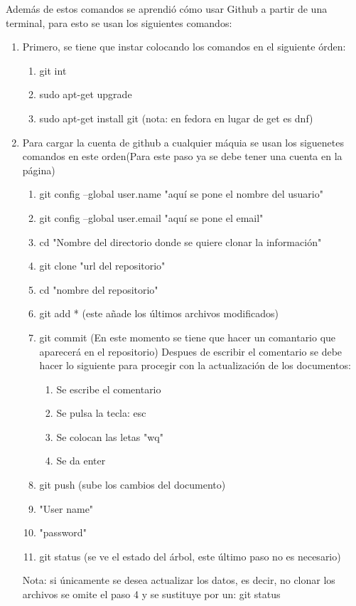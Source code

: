 \documentclass[letterpaper, 12pt, oneside]{article}
\begin{document}
	Además de estos comandos se aprendió cómo usar Github a partir de una terminal, para esto se usan los siguientes comandos:
	\begin{enumerate}
		\item 
		Primero, se tiene que instar colocando los comandos en el siguiente órden:
		\begin{enumerate}
			\item 
			git int
			\item 
			sudo apt-get upgrade
			\item 
			sudo apt-get install git (nota: en fedora en lugar de get es dnf)
		\end{enumerate}
		\item 
		Para cargar la cuenta de github a cualquier máquia se usan los siguenetes comandos en este orden(Para este paso ya se debe tener una cuenta en la página)
		\begin{enumerate}
			\item 
			git config --global user.name "aquí se pone el nombre del usuario"
			\item 
			git config --global user.email "aquí se pone el email"
			\item 
			cd "Nombre del directorio donde se quiere clonar la información"
			\item 
			git clone "url del repositorio"
			\item
			cd "nombre del repositorio"
			\item 
			git add * (este añade los últimos archivos modificados)
			\item 
			git commit (En este momento se tiene que hacer un comantario que aparecerá en el repositorio) Despues de escribir el comentario se debe hacer lo siguiente para procegir con la actualización de los documentos:
			\begin{enumerate}
				\item 
				Se escribe el comentario
				\item
				Se pulsa la tecla: esc
				\item
				Se colocan las letas "wq" 
				\item 
				Se da enter
			\end{enumerate}
			\item 
			git push  (sube los cambios del documento)
			\item 
			"User name"
			\item 
			"password"
			\item
			git status (se ve el estado del árbol, este último paso no es necesario)
	\end{enumerate}
	Nota: si únicamente se desea actualizar los datos, es decir, no clonar los archivos se omite el paso 4 y se sustituye por un: git status
\end{enumerate}
\end{document}
